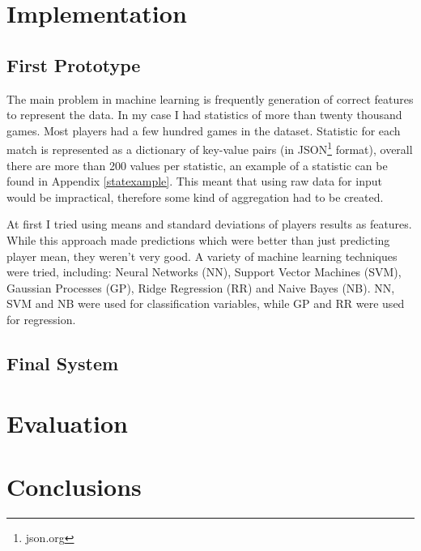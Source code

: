 \documentclass[12pt,a4paper]{book}
\begin{document}
\chapter{Implementation}
\section{First Prototype}
The main problem in machine learning is frequently generation of correct features to represent the data.
In my case I had statistics of more than twenty thousand games.
Most players had a few hundred games in the dataset.
Statistic for each match is represented as a dictionary of key-value pairs (in JSON\footnote{json.org} format), overall there are more than 200 values per statistic, an example of a statistic can be found in Appendix \ref{statexample}.
This meant that using raw data for input would be impractical, therefore some kind of aggregation had to be created.

At first I tried using means and standard deviations of players results as features.
While this approach made predictions which were better than just predicting player mean, they weren't very good.
A variety of machine learning techniques were tried, including: Neural Networks (NN), Support Vector Machines (SVM), Gaussian Processes (GP), Ridge Regression (RR) and Naive Bayes (NB).
NN, SVM and NB were used for classification variables, while GP and RR were used for regression.
\section{Final System}
\chapter{Evaluation}
\chapter{Conclusions}


\printbibliography[heading=bibintoc,title={Bibliography}]

\appendix
\end{document}
